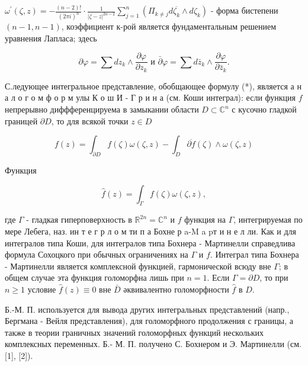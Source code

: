 \documentclass[10pt]{article}
\begin{document}
$\omega^{\prime}(\zeta, z)=-\frac{(n-2) !}{(2 \pi i)^{n}} \cdot \frac{1}{|\zeta-z|^{2 n-2}} \sum_{j=1}^{n}\left(\Pi_{k \neq j} d \overline{\zeta_{k}} \wedge d \zeta_{k}\right)$ - форма бистепени $(n-1, n-1)$, коэффициент к-рой является фундаментальным решением уравнения Лапласа; здесь



\[

\partial \varphi=\sum d z_{k} \wedge \frac{\partial \varphi}{\partial z_{k}} \text { и } \bar{\partial} \varphi=\sum d \bar{z}_{k} \wedge \frac{\partial \varphi}{\partial \bar{z}_{k}} .

\]



С.ледующее интегральное представление, обобщающее формулу (*), является а н а л о г о м ф о р м улы К о ш И - Г р и н а (см. Коши интеграл): если функция $f$ непрерывно диффференцируема в замыкании области $D \subset \mathbb{C}^{n}$ с кусочно гладкой границей $\partial D$, то для всякой точки $z \in D$



\[

f(z)=\int_{\partial D} f(\zeta) \omega(\zeta, z)-\int_{D} \overline{\partial f}(\zeta) \wedge \omega(\zeta, z)

\]



Функция



\[

\hat{f}(z)=\int_{\Gamma} f(\zeta) \omega(\zeta, z),

\]



где $\Gamma$ - гладкая гиперповерхность в $\mathbb{R}^{2 n}=\mathbb{C}^{n}$ и $f$ функция на $\Gamma$, интегрируемая по мере Лебега, наз. ин т е г р л о м ти п а Бохне р a-M a pт и н е л ли. Как и для интегралов типа Коши, для интегралов типа Бохнера - Мартинелли справедлива формула Сохоцкого при обычных ограничениях на $\Gamma$ и $f$. Интеграл типа Бохнера - Мартинелли является комплексной функцией, гармонической всюду вне $\Gamma$; в общем случае эта функция голоморфна лишь при $n=1$. Если $\Gamma=\partial D$, то при $n \geqslant 1$ условие $\hat{f}(z) \equiv 0$ вне $\bar{D}$ әквивалентно голоморфности $\hat{f}$ в $D$.



Б.-М. П. используется для вывода других интегральных представлений (напр., Бергмана - Вейля представления), для голоморфного продолжения с границы, а также в теории граничных значений голоморфных функций нескольких комплексных переменных. Б.- М. П. получено С. Бохнером и Э. Мартинелли (см. [1], [2]).
\end{document}
